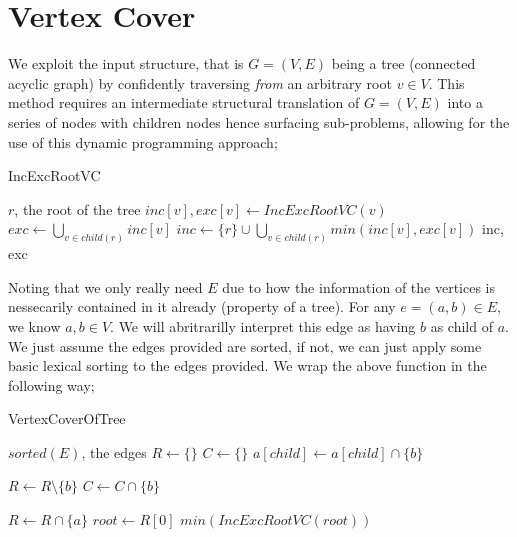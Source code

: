 \documentclass{article}
\begin{document}
\section*{Vertex Cover}
We exploit the input structure, that is $G = (V,E)$ being a tree (connected acyclic graph) by confidently traversing {\em from} an arbitrary root $v \in V$. This method requires an intermediate structural translation of $G = (V, E)$ into a series of nodes with children nodes hence surfacing sub-problems, allowing for the use of this dynamic programming approach;

\vspace{1em}
\begin{algorithm} \caption{IncExcRootVC}
\begin{algorithmic}[1]
\Require $r$, the root of the tree
\State $inc[v], exc[v] \gets IncExcRootVC(v)$
\EndFor
\State $exc \gets \bigcup_{v \in child(r)} inc[v]$
\State $inc \gets \{r\} \cup \bigcup_{v \in child(r)} min(inc[v], exc[v])$
\State \Return inc, exc
\end{algorithmic}
\end{algorithm}

Noting that we only really need $E$ due to how the information of the vertices is nessecarily contained in it already (property of a tree). For any $e = (a, b) \in E$, we know $a,b \in V$. We will abritrarilly interpret this edge as having $b$ as child of $a$. We just assume the edges provided are sorted, if not, we can just apply some basic lexical sorting to the edges provided. We wrap the above function in the following way;

\vspace{1em}
\begin{algorithm} \caption{VertexCoverOfTree}
\begin{algorithmic}[1]
\Require $sorted(E)$, the edges
\State $R \gets \{\}$
\State $C \gets \{\}$
\State $a[child] \gets a[child] \cap \{b\}$

\State $R \gets R \setminus \{b\}$
\State $C \gets C \cap \{b\}$

\State $R \gets R \cap \{a\}$
\EndIf
\EndFor
\State $root \gets R[0]$
\State \Return $min(IncExcRootVC(root))$
\end{algorithmic}
\end{algorithm}
\end{document}
